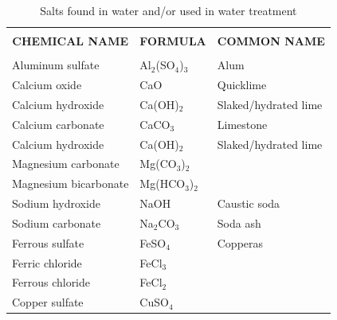 \begin{table}[h!]    
\begin{center}
     \begin{tabular}{ | m{5cm}  m{4cm}  m{4cm} |}
     \hline
           \multicolumn{1}{|c}{} & \multicolumn{1}{c}{} & \multicolumn{1}{c|}{}\\
      \multicolumn{1}{|c}{\textbf{CHEMICAL NAME}} & \multicolumn{1}{c}{\textbf{FORMULA}} & \multicolumn{1}{c|}{\textbf{COMMON NAME}}\\
            \multicolumn{1}{|c}{} & \multicolumn{1}{c}{} & \multicolumn{1}{c|}{}\\
      Aluminum sulfate & Al$_2$(SO$_4$)$_3$ & Alum\\
      Calcium oxide & Ca$ $O$ $ $ $ & Quicklime\\
      Calcium hydroxide & Ca$ $(OH$ $)$_2$ & Slaked/hydrated lime\\
      Calcium carbonate & Ca$ $CO$_3$ $ $ & Limestone\\
      Calcium hydroxide & Ca$ $(OH$ $)$_2$ & Slaked/hydrated lime\\
      Magnesium carbonate & Mg$ $(CO$_3$)$_2$ & \\
      Magnesium bicarbonate & Mg$ $(HCO$_3$)$_2$ & \\
      Sodium hydroxide & Na$ $OH$ $ $ $ & Caustic soda\\
      Sodium carbonate & Na$_2$CO$_3$ $ $ & Soda ash\\
      Ferrous sulfate & Fe$ $SO$_4$ $ $ & Copperas \\
      Ferric chloride & Fe$ $Cl$_3$ $ $ & \\
      Ferrous chloride & Fe$ $Cl$_2$ $ $ & \\
      Copper sulfate & Cu$ $SO$_4$ $ $ &\\

          \hline
                    \end{tabular}
     \caption{Salts found in water and/or used in water treatment}
     \label{Salts found in water and/or used in water treatment}
     
\end{center}
     \end{table}

